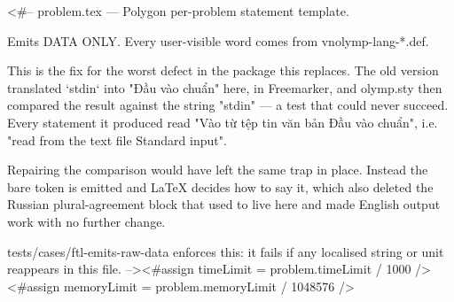 <#--
  problem.tex — Polygon per-problem statement template.

  Emits DATA ONLY. Every user-visible word comes from vnolymp-lang-*.def.

  This is the fix for the worst defect in the package this replaces. The old
  version translated `stdin` into "Đầu vào chuẩn" here, in Freemarker, and
  olymp.sty then compared the result against the string "stdin" — a test that
  could never succeed. Every statement it produced read "Vào từ tệp tin văn
  bản Đầu vào chuẩn", i.e. "read from the text file Standard input".

  Repairing the comparison would have left the same trap in place. Instead the
  bare token is emitted and LaTeX decides how to say it, which also deleted the
  Russian plural-agreement block that used to live here and made English
  output work with no further change.

  tests/cases/ftl-emits-raw-data enforces this: it fails if any localised
  string or unit reappears in this file.
--><#assign timeLimit = problem.timeLimit / 1000 />
<#assign memoryLimit = problem.memoryLimit / 1048576 />

